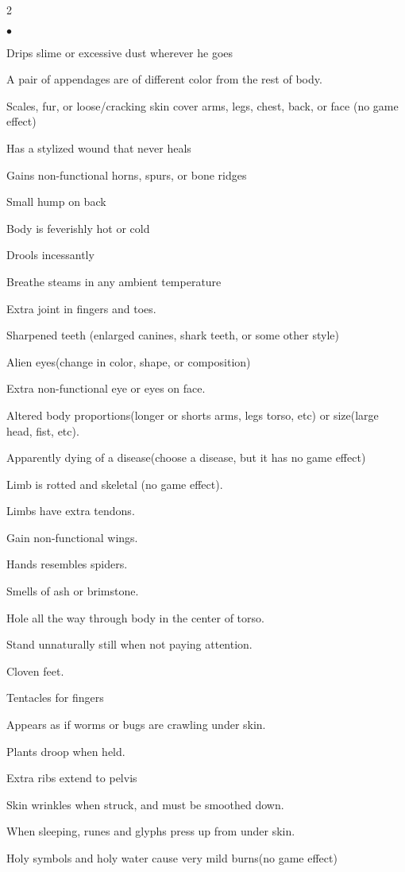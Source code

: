 \begin{table}[tbh]
\begin{small}
\begin{multicols}{2}
\begin{list}{$\bullet$}{\itemspace}
\item Drips slime or excessive dust wherever he goes
\item A pair of appendages are of different color from the rest of body.
\item Scales, fur, or loose/cracking skin cover arms, legs, chest, back, or face (no game effect)
\item Has a stylized wound that never heals
\item Gains non-functional horns, spurs, or bone ridges
\item Small hump on back
\item Body is feverishly hot or cold
\item Drools incessantly
\item Breathe steams in any ambient temperature
\item Extra joint in fingers and toes.
\item Sharpened teeth (enlarged canines, shark teeth, or some other style)
\item Alien eyes(change in color, shape, or composition)
\item Extra non-functional eye or eyes on face.
\item Altered body proportions(longer or shorts arms, legs torso, etc) or size(large head, fist, etc).
\item Apparently dying of a disease(choose a disease, but it has no game effect)
\item Limb is rotted and skeletal (no game effect).
\item Limbs have extra tendons.
\item Gain non-functional wings.
\item Hands resembles spiders.
\item Smells of ash or brimstone.
\item Hole all the way through body in the center of torso.
\item Stand unnaturally still when not paying attention.
\item Cloven feet.
\item Tentacles for fingers
\item Appears as if worms or bugs are crawling under skin.
\item Plants droop when held.
\item Extra ribs extend to pelvis
\item Skin wrinkles when struck, and must be smoothed down.
\item When sleeping, runes and glyphs press up from under skin.
\item Holy symbols and holy water cause very mild burns(no game effect)
\end{list}


\end{multicols}
\end{small}
\end{table}

